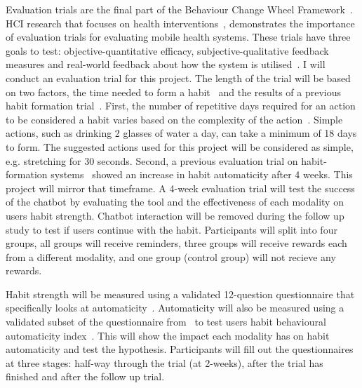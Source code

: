 Evaluation trials are the final part of the Behaviour Change Wheel Framework~\cite{article_behaviour_change_wheel}.
HCI research that focuses on health interventions~\cite{article_mhealth}, demonstrates the importance of evaluation trials for evaluating mobile health systems.
These trials have three goals to test: objective-quantitative efficacy, subjective-qualitative feedback measures and real-world feedback about how the system is
utilised~\cite{article_evaluate_tech_health_behaviour_change}. I will conduct an evaluation trial for this project.\newline
\newline
The length of the trial will be based on two factors, the time needed to form a habit~\cite{article_how_habits_formed_modelling_habit_formation} and the results of a previous
habit formation trial~\cite{article_beyond_self_tracking_designing_apps}.
First, the number of repetitive days required for an action to be considered a habit varies based on the complexity of the action~\cite{article_how_habits_formed_modelling_habit_formation}.
Simple actions, such as drinking 2 glasses of water a day, can take a minimum of 18 days to form.
The suggested actions used for this project will be considered as simple, e.g. stretching for 30 seconds.
Second, a previous evaluation trial on habit-formation systems~\cite{article_how_habits_formed_modelling_habit_formation} showed an increase in habit automaticity after 4 weeks.
This project will mirror that timeframe.\newline
\newline
A 4-week evaluation trial will test the success of the chatbot by evaluating the tool and the effectiveness of each modality on users habit strength.
Chatbot interaction will be removed during the follow up study to test if users continue with the habit.
Participants will split into four groups, all groups will receive reminders, three groups will receive rewards each from a different modality,
and one group (control group) will not recieve any rewards.

Habit strength will be measured using a validated 12-question questionnaire that specifically looks at automaticity~\cite{article_habit_strength}.
Automaticity will also be measured using a validated subset of the questionnaire from~\cite{article_habit_strength} to test users habit behavioural
automaticity index~\cite{article_4q_SRBAI}. This will show the impact each modality has on habit automaticity and test the hypothesis.
Participants will fill out the questionnaires~\cite{article_habit_strength, article_4q_SRBAI} at three stages: half-way through the trial (at 2-weeks),
after the trial has finished and after the follow up trial.

